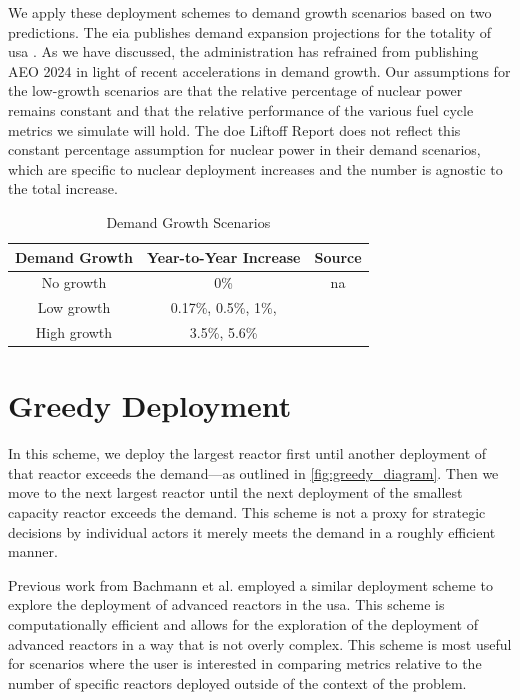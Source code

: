 We apply these deployment schemes to demand growth scenarios based on two
predictions. The \gls{eia} publishes demand expansion projections for the
totality of \gls{usa} \cite{eia_aeo_2023}. As we have discussed, the
administration has refrained from publishing AEO 2024 in light of recent
accelerations in demand growth. Our assumptions for the low-growth scenarios
are that the relative percentage of nuclear power remains constant and that the
relative performance of the various fuel cycle metrics we simulate will hold.
The \gls{doe} Liftoff Report \cite{julie_liftoff_pathways_2024} does not
reflect this constant percentage assumption for nuclear power in their demand
scenarios, which are specific to nuclear deployment increases and the number is
agnostic to the total increase.

\begin{table}[htbp]
    \centering
    \caption{Demand Growth Scenarios}
    \label{tab:demand_scenarios}
    \begin{tabular}{c c c}
        \hline
        \textbf{Demand Growth} & \textbf{Year-to-Year Increase} & \textbf{Source}\\
        \hline
 No growth & 0\% & na\\
 Low growth & 0.17\%, 0.5\%, 1\%, & \cite{eia_aeo_2023}\\
 High growth & 3.5\%, 5.6\% & \cite{julie_liftoff_pathways_2024}\\
        \hline
    \end{tabular}
\end{table}

\section{Greedy Deployment}
\label{sec:greedy_deployment}

In this scheme, we deploy the largest reactor first until another
deployment of that reactor exceeds the demand---as outlined in
\ref{fig:greedy_diagram}. Then we move to the next largest reactor until the
next deployment of the smallest capacity reactor exceeds the
demand. This scheme is not a proxy for strategic decisions by individual
actors it merely meets the demand in a roughly efficient manner.

Previous work from Bachmann et al. \cite{bachmann_enrichment_2021}
employed a similar deployment scheme to explore the deployment of advanced
reactors in the \gls{usa}. This scheme is computationally efficient and allows
for the exploration of the deployment of advanced reactors in a way that is not
overly complex. This scheme is most useful for scenarios where the user is
interested in comparing metrics relative to the number of specific reactors
deployed outside of the context of the problem.


